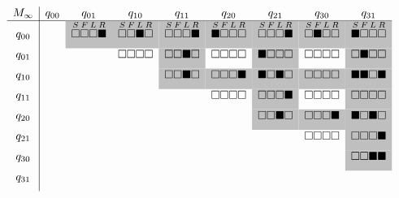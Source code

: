 \hspace{-0.18cm} \[
  \begin{array}{c|cccccccc}
    M_\infty & q_{00} & q_{01} & q_{10} & q_{11} & q_{20} & q_{21} & q_{30} & q_{31} \\ \hline
    q_{00}       &        &
    \cellcolor{lightgray}{\overset{S}{\ws}\overset{F}{\ws}\overset{L}{\ws}\overset{R}{\bs}} &
    \cellcolor{lightgray}{\overset{S}{\ws}\overset{F}{\ws}\overset{L}{\bs}\overset{R}{\ws}} &
    \cellcolor{lightgray}{\overset{S}{\ws}\overset{F}{\ws}\overset{L}{\ws}\overset{R}{\bs}} &
    \cellcolor{lightgray}{\overset{S}{\bs}\overset{F}{\ws}\overset{L}{\ws}\overset{R}{\ws}} &
    \cellcolor{lightgray}{\overset{S}{\ws}\overset{F}{\ws}\overset{L}{\ws}\overset{R}{\bs}} &
    \cellcolor{lightgray}{\overset{S}{\ws}\overset{F}{\bs}\overset{L}{\ws}\overset{R}{\ws}} &
    \cellcolor{lightgray}{\overset{S}{\bs}\overset{F}{\ws}\overset{L}{\ws}\overset{R}{\ws}} \\ [6pt]
    q_{01}       &        &              & \ws\ws\ws\ws & \cellcolor{lightgray}{\ws\ws\bs\ws} & \ws\ws\ws\ws & \cellcolor{lightgray}{\bs\ws\ws\ws} & \ws\ws\ws\ws & \cellcolor{lightgray}{\ws\bs\ws\ws} \\ [6pt]
    q_{10}       &        &              &              & \cellcolor{lightgray}{\ws\ws\bs\ws} & \cellcolor{lightgray}{\ws\ws\ws\bs} & \cellcolor{lightgray}{\bs\ws\bs\ws} & \cellcolor{lightgray}{\ws\ws\ws\ws} & \cellcolor{lightgray}{\bs\bs\ws\bs} \\ [6pt]
    q_{11}       &        &              &              &              & \ws\ws\ws\ws & \cellcolor{lightgray}{\ws\ws\ws\bs} & \ws\ws\ws\ws & \cellcolor{lightgray}{\ws\ws\ws\ws} \\ [6pt]
    q_{20}       &        &              &              &              &              & \cellcolor{lightgray}{\ws\ws\bs\ws} & \cellcolor{lightgray}{\ws\ws\ws\bs} & \cellcolor{lightgray}{\bs\ws\bs\ws} \\ [6pt]
    q_{21}       &        &              &              &              &              &              & \ws\ws\ws\ws & \cellcolor{lightgray}{\ws\ws\ws\bs} \\ [6pt]
    q_{30}       &        &              &              &              &              &              &              & \cellcolor{lightgray}{\ws\ws\bs\bs} \\ [6pt]
    q_{31}       &        &              &              &              &              &              &              &              \\ [6pt]
  \end{array}
\]